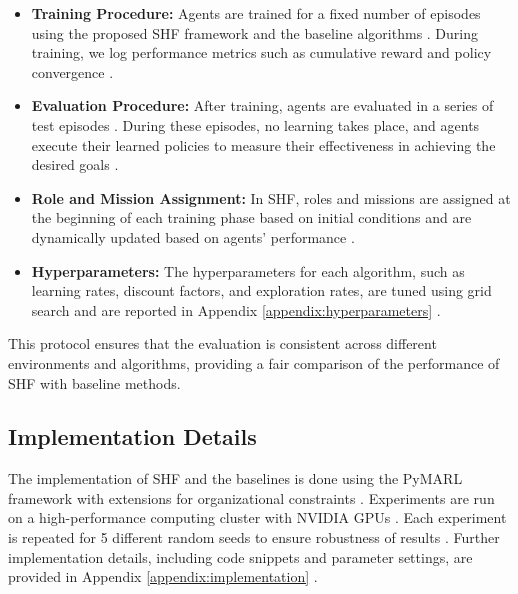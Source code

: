 \documentclass[sigconf,anonymous]{aamas}
\begin{document}
\begin{itemize}
    \item \textbf{Training Procedure:} Agents are trained for a fixed number of episodes using the proposed SHF framework and the baseline algorithms \cite{hubner2010moise, foerster2018counterfactual}. During training, we log performance metrics such as cumulative reward and policy convergence \cite{lowe2017multi}.
    \item \textbf{Evaluation Procedure:} After training, agents are evaluated in a series of test episodes \cite{foerster2016learning}. During these episodes, no learning takes place, and agents execute their learned policies to measure their effectiveness in achieving the desired goals \cite{lowe2017multi}.
    \item \textbf{Role and Mission Assignment:} In SHF, roles and missions are assigned at the beginning of each training phase based on initial conditions and are dynamically updated based on agents' performance \cite{hubner2010moise, soule2024}.
    \item \textbf{Hyperparameters:} The hyperparameters for each algorithm, such as learning rates, discount factors, and exploration rates, are tuned using grid search and are reported in Appendix \ref{appendix:hyperparameters} \cite{lowe2017multi, foerster2018counterfactual}.
\end{itemize}


This protocol ensures that the evaluation is consistent across different environments and algorithms, providing a fair comparison of the performance of SHF with baseline methods.

\subsection{Implementation Details}
The implementation of SHF and the baselines is done using the PyMARL framework \cite{pymarl_reference} with extensions for organizational constraints \cite{foerster2018counterfactual}. Experiments are run on a high-performance computing cluster with NVIDIA GPUs \cite{wei2019safe}. Each experiment is repeated for 5 different random seeds to ensure robustness of results \cite{foerster2016learning}. Further implementation details, including code snippets and parameter settings, are provided in Appendix \ref{appendix:implementation} \cite{hubner2010moise}.
\end{document}
